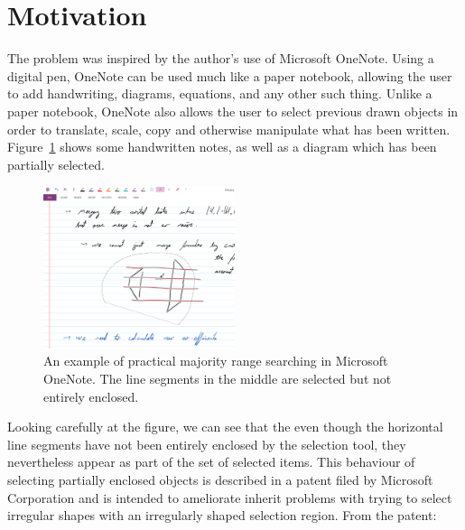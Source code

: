 \section{Motivation}
\label{:intro:motivation}

The problem was inspired by the author's use of Microsoft OneNote. 
Using a digital pen, OneNote can be used much like a paper notebook, allowing the user to add handwriting, diagrams, equations, and any other such thing.
Unlike a paper notebook, OneNote also allows the user to select previous drawn objects in order to translate, scale, copy and otherwise manipulate what has been written.
Figure~\ref{fig:intro:onenote} shows some handwritten notes, as well as a diagram which has been partially selected.

\begin{figure}
\begin{center}
  \includegraphics[width=0.50\textwidth]{figures/fig_onenote}
  \caption[An example of practical majority range searching]{An example of practical majority range searching in Microsoft OneNote. The line segments in the middle are selected but not entirely enclosed.}
  \label{fig:intro:onenote}
\end{center}
\end{figure}

Looking carefully at the figure, we can see that the even though the horizontal line segments have not been entirely enclosed by the selection tool, they nevertheless appear as part of the set of selected items.
This behaviour of selecting partially enclosed objects is described in a patent filed by Microsoft Corporation\cite{lassoselect} and is intended to ameliorate inherit problems with trying to select irregular shapes with an irregularly shaped selection region. 
From the patent:

